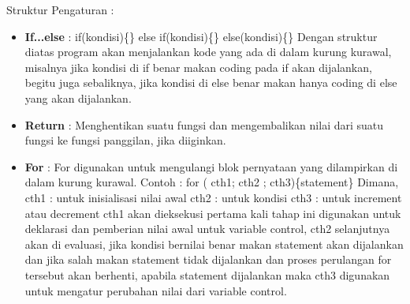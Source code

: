 Struktur Pengaturan :
\begin{itemize}
\item \textbf{If...else} :
if(kondisi)\{\}
else if(kondisi)\{\}
else(kondisi)\{\}
Dengan struktur diatas program akan menjalankan kode yang ada di dalam kurung kurawal, misalnya jika kondisi di if benar makan coding pada if akan dijalankan, begitu juga sebaliknya, jika kondisi di else benar makan hanya coding di else yang akan dijalankan.
\item \textbf{Return} : Menghentikan suatu fungsi dan mengembalikan nilai dari suatu fungsi ke fungsi panggilan, jika diiginkan.
\item \textbf{For} : 
For digunakan untuk mengulangi blok pernyataan yang dilampirkan di dalam kurung kurawal.
Contoh : for ( cth1; cth2 ; cth3)\{statement\}
Dimana,  cth1 :  untuk inisialisasi nilai awal
	    cth2 : untuk kondisi
	    cth3 : untuk increment atau decrement
cth1 akan dieksekusi pertama kali tahap ini digunakan untuk deklarasi dan pemberian nilai awal untuk variable control, cth2 selanjutnya akan di evaluasi, jika kondisi bernilai benar makan statement akan dijalankan dan jika salah makan statement tidak dijalankan dan proses perulangan for tersebut akan berhenti, apabila statement dijalankan maka cth3 digunakan untuk mengatur perubahan nilai dari variable control.
\end{itemize}

